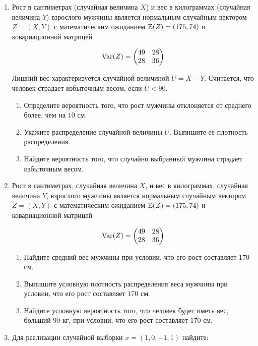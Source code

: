\begin{enumerate}

\item Рост в сантиметрах (случайная величина $X$) и вес в килограммах (случайная величина $Y$) взрослого мужчины является нормальным случайным вектором $Z = (X, Y)$ с математическим ожиданием $\mathbb{E}(Z) = (175, 74)$ и ковариационной матрицей

\[
\operatorname{Var}(Z) =
\begin{pmatrix}
 49 & 28 \\
28 & 36
\end{pmatrix}
\]

Лишний вес характеризуется случайной величиной $U = X - Y$. Считается, что человек страдает избыточным весом, если $U < 90$.

\begin{enumerate}
\item Определите вероятность того, что рост мужчины отклоняется от среднего более, чем на $10$ см.
\item Укажите распределение случайной величины $U$. Выпишите её плотность распределения.
\item Найдите вероятность того, что случайно выбранный мужчина страдает избыточным весом.
\end{enumerate}

\item Рост в сантиметрах, случайная величина $X$, и вес в килограммах, случайная величина $Y$, взрослого мужчины является нормальным случайным вектором $Z = (X, Y)$ с математическим ожиданием $\mathbb{E}(Z) = (175, 74)$ и ковариационной матрицей

\[
\operatorname{Var}(Z) =
\begin{pmatrix}
 49 & 28 \\
28 & 36
\end{pmatrix}
\]

\begin{enumerate}
\item Найдите средний вес мужчины при условии, что его рост составляет $170$ см.
\item Выпишите условную плотность распределения веса мужчины при условии, что его рост составляет $170$ см.
\item Найдите условную вероятность того, что человек будет иметь вес, больший $90$ кг, при условии, что его рост составляет $170$ см.
\end{enumerate}

\item Для реализации случайной выборки $x=(1,0,-1,1)$ найдите:


\end{enumerate}
